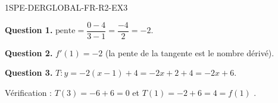 \begin{corrige}{1SPE-DERGLOBAL-FR-R2-EX3}


\textbf{Question 1.}
$\text{pente} = \dfrac{0 - 4}{3 - 1} = \dfrac{-4}{2} = -2.$

\textbf{Question 2.}
$f'(1) = -2$ (la pente de la tangente est le nombre dérivé).

\textbf{Question 3.}
$T : y = -2(x - 1) + 4 = -2x + 2 + 4 = -2x + 6.$

Vérification : $T(3) = -6 + 6 = 0$ \checkmark et $T(1) = -2 + 6 = 4 = f(1)$ \checkmark.

\end{corrige}
